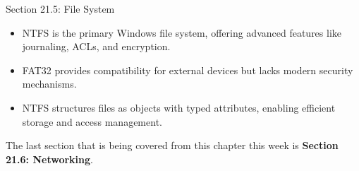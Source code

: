 \begin{notes}{Section 21.5: File System}
    \begin{highlight}
        \begin{itemize}
            \item NTFS is the primary Windows file system, offering advanced features like journaling, ACLs, and encryption.
            \item FAT32 provides compatibility for external devices but lacks modern security mechanisms.
            \item NTFS structures files as objects with typed attributes, enabling efficient storage and access management.
        \end{itemize}
    \end{highlight}
\end{notes}

The last section that is being covered from this chapter this week is \textbf{Section 21.6: Networking}.

